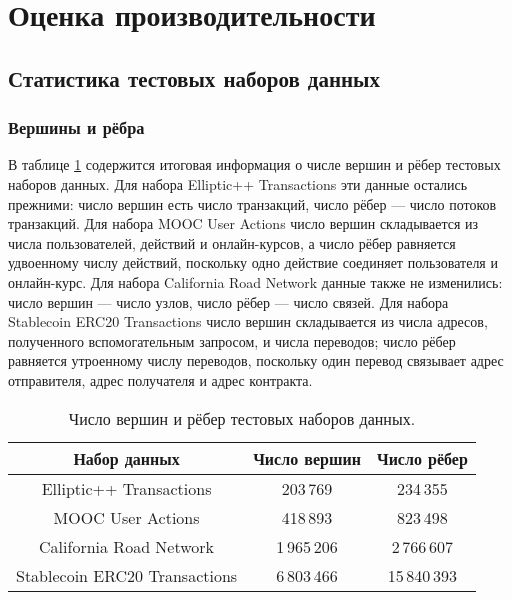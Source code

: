 \section{Оценка производительности}

\subsection{Статистика тестовых наборов данных}

\subsubsection{Вершины и рёбра}

В таблице \ref{table:datasetsTopology} содержится итоговая информация о числе вершин и рёбер тестовых наборов данных.
Для набора Elliptic++ Transactions эти данные остались прежними: число вершин есть число транзакций, число рёбер ---
число потоков транзакций. Для набора MOOC User Actions число вершин складывается из числа пользователей, действий и
онлайн-курсов, а число рёбер равняется удвоенному числу действий, поскольку одно действие соединяет пользователя и
онлайн-курс. Для набора California Road Network данные также не изменились: число вершин --- число узлов, число рёбер
--- число связей. Для набора Stablecoin ERC20 Transactions число вершин складывается из числа адресов, полученного
вспомогательным запросом, и числа переводов; число рёбер равняется утроенному числу переводов, поскольку один перевод
связывает адрес отправителя, адрес получателя и адрес контракта.

\begin{table}[!htb]
\caption{\centering Число вершин и рёбер тестовых наборов данных.}
\small
\centering\begin{tabular}{||c||c|c||}
\hline\hline
Набор данных & Число вершин & Число рёбер \\
\hline\hline
Elliptic++ Transactions & 203\,769 & 234\,355 \\
\hline
MOOC User Actions & 418\,893 & 823\,498 \\
\hline
California Road Network & 1\,965\,206 & 2\,766\,607 \\
\hline
Stablecoin ERC20 Transactions & 6\,803\,466 & 15\,840\,393 \\
\hline\hline
\end{tabular}
\label{table:datasetsTopology}
\end{table}

